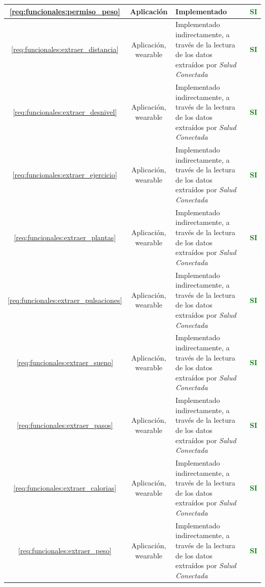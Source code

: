 \begin{xltabular}{\textwidth}{|c|c|X|c|}
        \hline
        \ref{req:funcionales:permiso_peso} & Aplicación & Implementado & \textcolor{green}{\textbf{SI}} \\
        \hline
        \ref{req:funcionales:extraer_distancia} & Aplicación, \gls{wearable} & Implementado indirectamente, a través de la lectura de los datos extraídos por \textit{Salud Conectada} & \textcolor{green}{\textbf{SI}} \\
        \hline
        \ref{req:funcionales:extraer_desnivel} & Aplicación, \gls{wearable} & Implementado indirectamente, a través de la lectura de los datos extraídos por \textit{Salud Conectada} & \textcolor{green}{\textbf{SI}} \\
        \hline
        \ref{req:funcionales:extraer_ejercicio} & Aplicación, \gls{wearable} & Implementado indirectamente, a través de la lectura de los datos extraídos por \textit{Salud Conectada} & \textcolor{green}{\textbf{SI}} \\
        \hline
        \ref{req:funcionales:extraer_plantas} & Aplicación, \gls{wearable} & Implementado indirectamente, a través de la lectura de los datos extraídos por \textit{Salud Conectada} & \textcolor{green}{\textbf{SI}} \\
        \hline
        \ref{req:funcionales:extraer_pulsaciones} & Aplicación, \gls{wearable} & Implementado indirectamente, a través de la lectura de los datos extraídos por \textit{Salud Conectada} & \textcolor{green}{\textbf{SI}} \\
        \hline
        \ref{req:funcionales:extraer_sueno} & Aplicación, \gls{wearable} & Implementado indirectamente, a través de la lectura de los datos extraídos por \textit{Salud Conectada} & \textcolor{green}{\textbf{SI}} \\
        \hline
        \ref{req:funcionales:extraer_pasos} & Aplicación, \gls{wearable} & Implementado indirectamente, a través de la lectura de los datos extraídos por \textit{Salud Conectada} & \textcolor{green}{\textbf{SI}} \\
        \hline
        \ref{req:funcionales:extraer_calorias} & Aplicación, \gls{wearable} & Implementado indirectamente, a través de la lectura de los datos extraídos por \textit{Salud Conectada} & \textcolor{green}{\textbf{SI}} \\
        \hline
        \ref{req:funcionales:extraer_peso} & Aplicación, \gls{wearable} & Implementado indirectamente, a través de la lectura de los datos extraídos por \textit{Salud Conectada} & \textcolor{green}{\textbf{SI}} \\

\end{xltabular}
